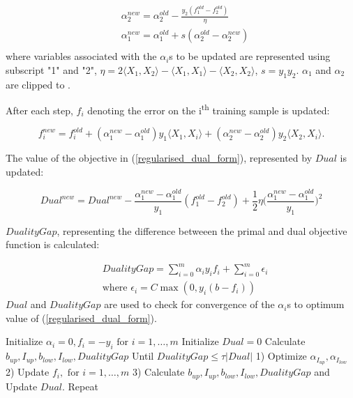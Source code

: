 \documentclass{article}
\begin{document}
		\begin{equation}
			\begin{aligned}
				& \alpha_2^{new} = \alpha_2^{old} - \frac{y_2 (f_1^{old} - f_2^{old})}{\eta}\\
				& \alpha_1^{new} = \alpha_1^{old} + s (\alpha_2^{old} - \alpha_2^{new})\\
			\end{aligned}
		\end{equation}		
		where variables associated with the $\alpha_i$s to be updated are represented using subscript "1" and "2", $\eta = 2 \langle X_1, X_2 \rangle - \langle X_1, X_1 \rangle - \langle X_2, X_2 \rangle$, $s = y_1 y_2$. $\alpha_1$ and $\alpha_2$ are clipped to \big[ 0, C \big].
	
		After each step, $f_i$ denoting the error on the i\textsuperscript{th} training sample is updated:
	
		\begin{equation}
			f_i^{new} = f_i^{old} + (\alpha_1^{new} - \alpha_1^{old}) y_1 \langle X_1, X_i \rangle + (\alpha_2^{new} - \alpha_2^{old}) y_2 \langle X_2, X_i \rangle.
		\end{equation}
	
		The value of the objective in (\ref{regularised_dual_form}), represented by $Dual$ is updated:
		
		\begin{equation}
			Dual^{new} = Dual^{new} - \frac{\alpha_1^{new} - \alpha_1^{old}}{y_1}(f_1^{old} - f_2^{old}) + \frac{1}{2} \eta \bigg(\frac{\alpha_1^{new} - \alpha_1^{old}}{y_1}\bigg)^2
		\end{equation}
	
		$DualityGap$, representing the difference betweeen the primal and dual objective function is calculated:
	
		\begin{equation}
			\begin{aligned}
				& DualityGap = \sum_{i=0}^{m} \alpha_i y_i f_i + \sum_{i=0}^{m} \epsilon_i \\
				& \text{where } \epsilon_i = 
					C \max (0, y_i (b-f_i))
			\end{aligned}
		\end{equation}
		$Dual$ and $DualityGap$ are used to check for convergence of the $\alpha_i$s to optimum value of (\ref{regularised_dual_form}).
	
		\begin{algorithm}[caption={Modified SMO Algorithm}]
	Initialize $\alpha_i = 0, f_i = -y_i \text{ for } i=1, \ldots, m $
	Initialize $Dual = 0$
	Calculate $b_{up}, I_{up}, b_{low}, I_{low}, DualityGap$
	Until $DualityGap \leq \tau | Dual | $
		1) Optimize $\alpha_{I_{up}}, \alpha_{I_{low}}$
		2) Update $f_i, \text{ for } i=1, \ldots, m $
		3) Calculate $b_{up}, I_{up}, b_{low}, I_{low}, DualityGap$ and Update $Dual$.
	Repeat
		\end{algorithm}
		
\end{document}
